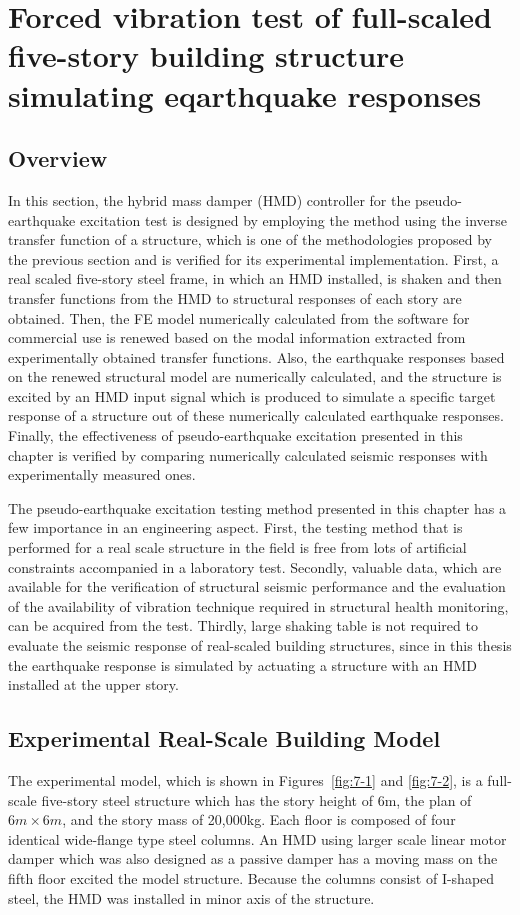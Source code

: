\section{Forced vibration test of full-scaled five-story building structure simulating eqarthquake responses}
\label{chap:7}
\subsection{Overview}


In this section, the hybrid mass damper (HMD) controller for the pseudo-earthquake excitation test is designed by employing the method using the inverse transfer function of a structure, which is one of the methodologies proposed by the previous section and is verified for its experimental implementation. First, a real scaled five-story steel frame, in which an HMD installed, is shaken and then transfer functions from the HMD to structural responses of each story are obtained. Then, the FE model numerically calculated from the software for commercial use is renewed based on the modal information extracted from experimentally obtained transfer functions. Also, the earthquake responses based on the renewed structural model are numerically calculated, and the structure is excited by an HMD input signal which is produced to simulate a specific target response of a structure out of these numerically calculated earthquake responses. Finally, the effectiveness of pseudo-earthquake excitation presented in this chapter is verified by comparing numerically calculated seismic responses with experimentally measured ones.

The pseudo-earthquake excitation testing method presented in this chapter has a few importance in an engineering aspect. First, the testing method that is performed for a real scale structure in the field is free from lots of artificial constraints accompanied in a laboratory test. Secondly, valuable data, which are available for the verification of structural seismic performance and the evaluation of the availability of vibration technique required in structural health monitoring, can be acquired from the test. Thirdly, large shaking table is not required to evaluate the seismic response of real-scaled building structures, since in this thesis the earthquake response is simulated by actuating a structure with an HMD installed at the upper story.

\subsection{Experimental Real-Scale Building Model}
The experimental model, which is shown in Figures~\ref{fig:7-1} and \ref{fig:7-2}, is a full-scale five-story steel structure which has the story height of 6m, the plan of $6m\times6m$, and the story mass of 20,000kg. Each floor is composed of four identical wide-flange type steel columns. An HMD using larger scale linear motor damper which was also designed as a passive damper has a moving mass on the fifth floor excited the model structure. Because the columns consist of I-shaped steel, the HMD was installed in minor axis of the structure.

